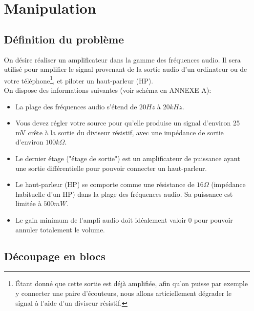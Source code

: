 
\vspace{5cm}
\newpage

\section{Manipulation}
\subsection{Définition du problème}
On désire réaliser un amplificateur dans la gamme des fréquences audio. Il sera utilisé pour amplifier le signal provenant de la sortie audio d'un ordinateur ou de votre téléphone\footnote{Étant donné que cette sortie est déjà amplifiée, afin qu'on puisse par
exemple y connecter une paire d'écouteurs, nous allons articiellement dégrader le signal
à l'aide d'un diviseur résistif.}, et piloter un haut-parleur (HP).\\

On dispose des informations suivantes (voir schéma en ANNEXE A):
\begin{itemize}
\item La plage des fréquences audio s'étend de $20Hz$ à $20kHz$.
\item Vous devez régler votre source pour qu'elle produise un signal d'environ 25 mV crête à la sortie du diviseur résistif, avec une impédance de sortie d'environ $100k\Omega$.
\item Le dernier étage ("étage de sortie") est un amplificateur de puissance ayant une sortie différentielle pour pouvoir connecter un haut-parleur.
\item Le haut-parleur (HP) se comporte comme une résistance de $16\Omega$ (impédance habituelle d'un HP)
dans la plage des fréquences audio. Sa puissance est limitée à $500mW$.
\item Le gain minimum de l'ampli audio doit idéalement valoir $0$ pour pouvoir annuler totalement le volume.
\end{itemize}

 \subsection{Découpage en blocs}


